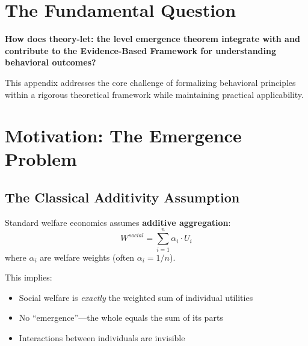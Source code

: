 \section{The Fundamental Question}
\label{sec:let-fundamental}

\begin{tcolorbox}[
    colback=red!5!white,
    colframe=red!75!black,
    title={\textbf{Fundamental Question}}
]
\textbf{How does theory-let: the level emergence theorem integrate with and contribute to the
Evidence-Based Framework for understanding behavioral outcomes?}

This appendix addresses the core challenge of formalizing behavioral principles
within a rigorous theoretical framework while maintaining practical applicability.
\end{tcolorbox}






\section{Motivation: The Emergence Problem}
\label{sec:let-motivation}

\subsection{The Classical Additivity Assumption}

Standard welfare economics assumes \textbf{additive aggregation}:
\begin{equation}
W^{social} = \sum_{i=1}^{n} \alpha_i \cdot U_i
\label{eq:additive-welfare}
\end{equation}
where $\alpha_i$ are welfare weights (often $\alpha_i = 1/n$).

This implies:
\begin{itemize}
\item Social welfare is \textit{exactly} the weighted sum of individual utilities
\item No ``emergence''---the whole equals the sum of its parts
\item Interactions between individuals are invisible
\end{itemize}

